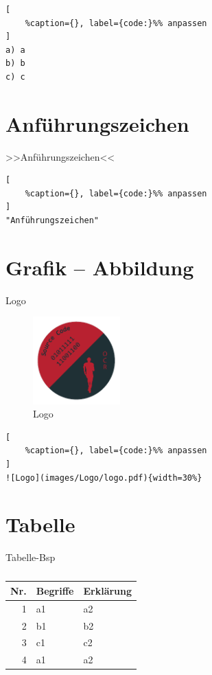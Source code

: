 \lstset{language=Python}%
\begin{lstlisting}[
	%caption={}, label={code:}%% anpassen
]
a) a
b) b
c) c
\end{lstlisting}

\section{Anführungszeichen}\label{anfuehrungszeichen}

>>Anführungszeichen<<

\lstset{language=Python}%
\begin{lstlisting}[
	%caption={}, label={code:}%% anpassen
]
"Anführungszeichen" 
\end{lstlisting}

\section{Grafik -- Abbildung}\label{grafik-abbildung}

Logo %

\begin{figure}[!ht]%
\centering
\includegraphics[width=0.3\textwidth]{images/Logo/logo.pdf}
\caption{Logo}
\end{figure}

\lstset{language=Python}%
\begin{lstlisting}[
	%caption={}, label={code:}%% anpassen
]
![Logo](images/Logo/logo.pdf){width=30%}
\end{lstlisting}

\section{Tabelle}\label{tabelle}

Tabelle-Bsp %

\begin{table}[!ht]%
\centering 
	\caption{}%
\begin{tabular}{@{}rll@{}}
\hline
\textbf{Nr.} & \textbf{Begriffe} & \textbf{Erklärung} \\
\hline
1 & a1 & a2 \\
2 & b1 & b2 \\
3 & c1 & c2 \\
4 & a1 & a2 \\
\hline
\end{tabular} 
\end{table}

